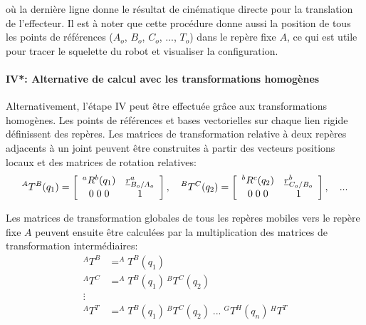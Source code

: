 où la dernière ligne donne le résultat de cinématique directe pour la translation de l'effecteur. Il est à noter que cette procédure donne aussi la position de tous les points de références ($A_o$, $B_o$, $C_o$, ..., $T_o$) dans le repère fixe $A$, ce qui est utile pour tracer le squelette du robot et visualiser la configuration.


\paragraph{IV*: Alternative de calcul avec les transformations homogènes}

Alternativement, l'étape IV peut être effectuée grâce aux transformations homogènes. Les points de références et bases vectorielles sur chaque lien rigide définissent des repères. Les matrices de transformation relative à deux repères adjacents à un joint peuvent être construites à partir des vecteurs positions locaux et des matrices de rotation relatives:
\begin{align}
	^AT^B(q_1)
	=
	\left[ \begin{array}{c c }
			   ^aR^b(q_1)  & \underline{r}_{B_o/A_o}^a \\ 0 \; 0 \; 0 & 1
	\end{array} \right] ,
	\quad
	^BT^C(q_2)
	=
	\left[ \begin{array}{c c }
			   ^bR^c(q_2)  & \underline{r}_{C_o/B_o}^b \\ 0 \; 0 \; 0 & 1
	\end{array} \right] ,
	\quad
	...
\end{align}

Les matrices de transformation globales de tous les repères mobiles vers le repère fixe $A$ peuvent ensuite être calculées par la multiplication des matrices de transformation intermédiaires:
\begin{align}
	^AT^B &= ^AT^B(q_1) \\
	^AT^C &= ^AT^B(q_1) \,  ^BT^C(q_2) \\
	\vdots  & \nonumber \\
	^AT^T &= ^AT^B(q_1) \,  ^BT^C(q_2) \; ... \; ^GT^H(q_n) \, ^HT^T
\end{align}

